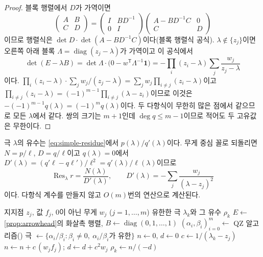 \begin{proof}
블록 행렬에서 $D$가 가역이면
\[
\begin{pmatrix}A&B\\C&D\end{pmatrix}=\begin{pmatrix}I&BD^{-1}\\0&I\end{pmatrix}\begin{pmatrix}A-BD^{-1}C&0\\C&D\end{pmatrix}
\]
이므로 행렬식은 $\det D\cdot\det(A-BD^{-1}C)$이다(블록 행렬식 공식). $\lambda\notin\{z_j\}$이면 오른쪽 아래 블록 $\Lambda=\operatorname{diag}(z_j-\lambda)$가 가역이고 이 공식에서
\[
\det(E-\lambda B)=\det\Lambda\cdot\bigl(0-w^{\mathsf T}\Lambda^{-1}\mathbf 1\bigr)=-\prod_i(z_i-\lambda)\sum_j\frac{w_j}{z_j-\lambda}
\]
이다. $\prod_i(z_i-\lambda)\cdot\sum_jw_j/(z_j-\lambda)=\sum_jw_j\prod_{i\ne j}(z_i-\lambda)$이고 $\prod_{i\ne j}(z_i-\lambda)=(-1)^{m-1}\prod_{i\ne j}(\lambda-z_i)$이므로 이것은 $-(-1)^{m-1}q(\lambda)=(-1)^mq(\lambda)$이다. 두 다항식이 무한히 많은 점에서 같으므로 모든 $\lambda$에서 같다. 쌍의 크기는 $m+1$인데 $\deg q\le m-1$이므로 적어도 두 고유값은 무한이다.
\end{proof}

극 $\lambda$의 유수는 \cref{eq:simple-residue}에서 $p(\lambda)/q'(\lambda)$이다. 무게 중심 꼴로 되돌리면 $N=p/\ell$, $D=q/\ell$이고 $q(\lambda)=0$에서 $D'(\lambda)=(q'\ell-q\ell')/\ell^2=q'(\lambda)/\ell(\lambda)$이므로
\begin{equation}
\label{eq:bary-residue}
\operatorname{Res}_\lambda r=\frac{N(\lambda)}{D'(\lambda)},\qquad D'(\lambda)=-\sum_j\frac{w_j}{(\lambda-z_j)^2}
\end{equation}
이다. 다항식 계수를 만들지 않고 $O(m)$번의 연산으로 계산된다.

\begin{algorithm}[htbp]
\begin{algorithmic}[1]
\Require 지지점 $z_j$, 값 $f_j$, $0$이 아닌 무게 $w_j$ ($j=1,\dots,m$)
\Ensure 유한한 극 $\lambda_k$와 그 유수 $\rho_k$
\State $E\gets$ \cref{prop:arrowhead}의 화살촉 행렬, $B\gets\operatorname{diag}(0,1,\dots,1)$
\State $(\alpha_i,\beta_i)_{i=0}^m\gets$ QZ 알고리즘() 
\State 극 $\gets\{\alpha_i/\beta_i:\beta_i\ne0,\ \alpha_i/\beta_i\text{가 유한}\}$ 
  \State $n\gets0$, $d\gets0$
    \State $c\gets1/(\lambda_k-z_j)$ 
    \State $n\gets n+c\,(w_jf_j)$; $d\gets d+c^2w_j$
  \EndFor
  \State $\rho_k\gets n/(-d)$ 
\EndFor
\end{algorithmic}
\caption{무게 중심 유리 함수의 극과 유수 (stardust 의 , )}
\label{alg:bary-poles}
\end{algorithm}

